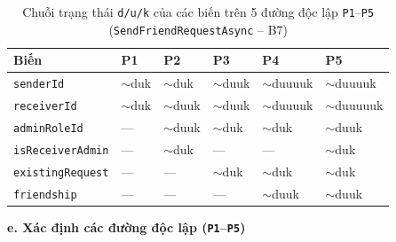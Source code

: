 \documentclass[11pt,a4paper]{article}
\begin{document}
\begin{table}[H]
\centering
\small
\begin{tabularx}{\textwidth}{|X|C{2.2cm}|C{2.2cm}|C{2.2cm}|C{2.2cm}|C{2.2cm}|}
\hline
{}
\textbf{Biến} & \textbf{P1} & \textbf{P2} & \textbf{P3} & \textbf{P4} & \textbf{P5} \tabularnewline
\hline
\texttt{senderId} & $\sim$duk & $\sim$duk & $\sim$duuk & $\sim$duuuuk & $\sim$duuuuk \\ \hline
\texttt{receiverId} & $\sim$duk & $\sim$duuk & $\sim$duuk & $\sim$duuuuk & $\sim$duuuuuk \\ \hline
\texttt{adminRoleId} & --- & $\sim$duuk & $\sim$duk & $\sim$duk & $\sim$duuk \\ \hline
\texttt{isReceiverAdmin} & --- & $\sim$duk & --- & --- & $\sim$duk \\ \hline
\texttt{existingRequest} & --- & --- & $\sim$duk & $\sim$duk & $\sim$duk \\ \hline
\texttt{friendship} & --- & --- & --- & $\sim$duuk & $\sim$duuk \\ \hline
\end{tabularx}
\caption{Chuỗi trạng thái \texttt{d/u/k} của các biến trên 5 đường độc lập \texttt{P1}--\texttt{P5} (\texttt{SendFriendRequestAsync} -- B7)}
\end{table}

\noindent\textbf{e. Xác định các đường độc lập (\texttt{P1}--\texttt{P5}) }
\end{document}
